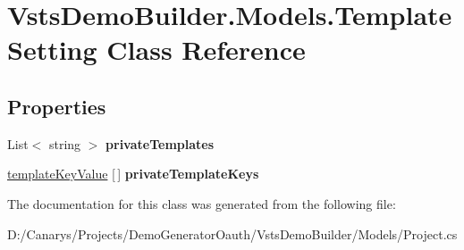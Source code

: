 \hypertarget{class_vsts_demo_builder_1_1_models_1_1_template_setting}{}\section{Vsts\+Demo\+Builder.\+Models.\+Template\+Setting Class Reference}
\label{class_vsts_demo_builder_1_1_models_1_1_template_setting}
\subsection*{Properties}
\begin{DoxyCompactItemize}
\item 
\mbox{\label{class_vsts_demo_builder_1_1_models_1_1_template_setting_ac57d426bce9483bd012c0715a65a3874}} 
List$<$ string $>$ {\bfseries private\+Templates}
\item 
\mbox{\label{class_vsts_demo_builder_1_1_models_1_1_template_setting_a9b914ee363bfb1c227d03ad91ad90f0d}} 
\mbox{\hyperlink{class_vsts_demo_builder_1_1_models_1_1template_key_value}{template\+Key\+Value}} \mbox{[}$\,$\mbox{]} {\bfseries private\+Template\+Keys}
\end{DoxyCompactItemize}


The documentation for this class was generated from the following file\+:\begin{DoxyCompactItemize}
\item 
D\+:/\+Canarys/\+Projects/\+Demo\+Generator\+Oauth/\+Vsts\+Demo\+Builder/\+Models/Project.\+cs\end{DoxyCompactItemize}
